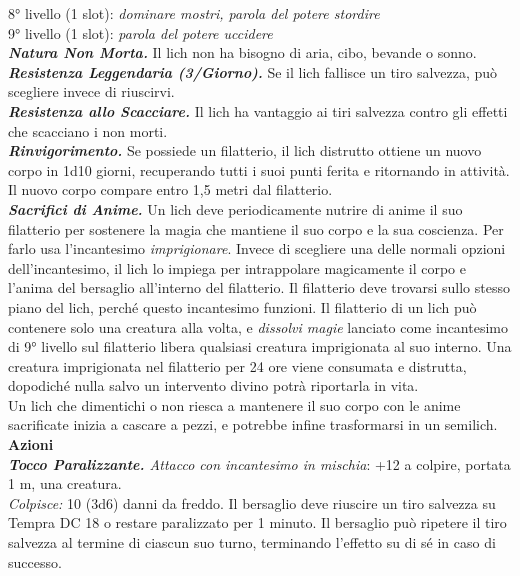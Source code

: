 \begin{multicols}{2}
8° livello (1 slot): \emph{dominare mostri, parola del potere stordire}\\
9° livello (1 slot): \emph{parola del potere uccidere}\\
\emph{\textbf{Natura Non Morta.}} Il lich non ha bisogno di aria, cibo, bevande o sonno.\\
\emph{\textbf{Resistenza Leggendaria (3/Giorno).}} Se il lich fallisce un tiro salvezza, può scegliere invece di riuscirvi.\\
\emph{\textbf{Resistenza allo Scacciare.}} Il lich ha vantaggio ai tiri salvezza contro gli effetti che scacciano i non morti.\\
\emph{\textbf{Rinvigorimento.}} Se possiede un filatterio, il lich distrutto ottiene un nuovo corpo in 1d10 giorni, recuperando tutti i suoi punti ferita e ritornando in attività. Il nuovo corpo compare entro 1,5 metri dal filatterio.\\

\emph{\textbf{Sacrifici di Anime.}} Un lich deve periodicamente nutrire di anime il suo filatterio per sostenere la magia che mantiene il suo corpo e la sua coscienza. Per farlo usa l'incantesimo \emph{imprigionare}. Invece di scegliere una delle normali opzioni dell'incantesimo, il lich lo impiega per intrappolare magicamente il corpo e l'anima del bersaglio all'interno del filatterio. Il filatterio deve trovarsi sullo stesso piano del lich, perché questo incantesimo funzioni. Il filatterio di un lich può contenere solo una creatura alla volta, e \emph{dissolvi magie} lanciato come incantesimo di 9° livello sul filatterio libera qualsiasi creatura imprigionata al suo interno. Una creatura imprigionata nel filatterio per 24 ore viene consumata e distrutta, dopodiché nulla salvo un intervento divino potrà riportarla in vita.\\
Un lich che dimentichi o non riesca a mantenere il suo corpo con le anime sacrificate inizia a cascare a pezzi, e potrebbe infine trasformarsi in un semilich.\\

\smallskip\textbf{Azioni}\\

\emph{\textbf{Tocco Paralizzante.} Attacco con incantesimo in mischia}: +12 a colpire, portata 1 m, una creatura.\\

\emph{Colpisce:} 10 (3d6) danni da freddo. Il bersaglio deve riuscire un tiro salvezza su Tempra DC 18 o restare paralizzato per 1 minuto. Il bersaglio può ripetere il tiro salvezza al termine di ciascun suo turno, terminando l'effetto su di sé in caso di successo.\\


\end{multicols}
